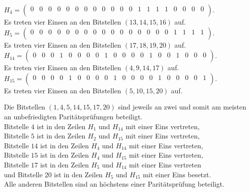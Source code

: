\begin{Beispiel}
    $H_4= \left( \begin{array}{rrrrrrrrrrrrrrrrrrrr}
        0 & 0 & 0 & 0 & 0 & 0 & 0 & 0 & 0 & 0 & 0 & 0 & 1 & 1 & 1 & 1 & 0 & 0 & 0 & 0 \\
       \end{array}\right). 
    $\\
    Es treten vier Einsen an den Bitstellen $(13, 14, 15, 16)$ auf.\\
    
    $H_5= \left( \begin{array}{rrrrrrrrrrrrrrrrrrrr}
        0 & 0 & 0 & 0 & 0 & 0 & 0 & 0 & 0 & 0 & 0 & 0 & 0 & 0 & 0 & 0 & 1 & 1 & 1 & 1 \\
       \end{array}\right). 
    $\\
    Es treten vier Einsen an den Bitstellen $(17, 18, 19, 20)$ auf.\\
    
    $H_{14}=\left( \begin{array}{rrrrrrrrrrrrrrrrrrrr}
        0 & 0 & 0 & 1 & 0 & 0 & 0 & 0 & 1 & 0 & 0 & 0 & 0 & 1 & 0 & 0 & 1 & 0 & 0 & 0 \\
       \end{array}\right). 
    $\\
    Es treten vier Einsen an den Bitstellen $(4, 9, 14, 17)$ auf.\\
    
    $H_{15}=\left( \begin{array}{rrrrrrrrrrrrrrrrrrrr}
        0 & 0 & 0 & 0 & 1 & 0 & 0 & 0 & 0 & 1 & 0 & 0 & 0 & 0 & 1 & 0 & 0 & 0 & 0 & 1 \\
       \end{array}\right). 
    $\\
    Es treten vier Einsen an den Bitstellen $(5, 10, 15, 20)$ auf.\\
    \pagebreak
    
    
    Die Bitstellen $(1, 4, 5, 14, 15, 17, 20)$ sind jeweils an zwei und somit am meisten an unbefriedigten Paritätsprüfungen beteiligt.\\ 
    Bitstelle $4$ ist in den Zeilen $H_1$ und $H_{14}$ mit einer Eins vertreten,\\
    Bitstelle $5$ ist in den Zeilen $H_2$ und $H_{15}$  mit einer Eins vertreten,\\
    Bitstelle $14$ ist in den Zeilen $H_4$ und $H_{14}$  mit einer Eins vertreten,\\ 
    Bitstelle $15$ ist in den Zeilen $H_4$ und $H_{15}$ mit einer Eins vertreten,\\
    Bitstelle $17$ ist in den Zeilen $H_5$ und $H_{14}$ mit einer Eins vertreten\\    
    und Bitstelle $20$ ist in den Zeilen $H_5$ und $H_{15}$ mit einer Eins besetzt.\\
    Alle anderen Bitstellen sind an höchstens einer Paritätsprüfung beteiligt.\\
     

\end{Beispiel}
